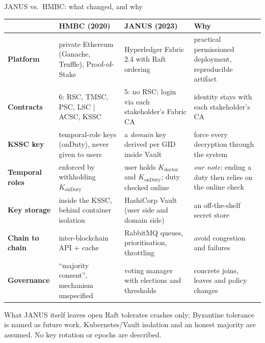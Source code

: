 \documentclass[aspectratio=169,10pt]{beamer}
\begin{document}
\begin{frame}{JANUS vs.\ HMBC: what changed, and why}
\scriptsize
\renewcommand{\arraystretch}{1.2}
\begin{tabular}{@{}>{\bfseries}L{0.14\textwidth} L{0.26\textwidth} L{0.30\textwidth} L{0.27\textwidth}@{}}
\toprule
 & \textbf{HMBC (2020)} & \textbf{JANUS (2023)} & \textbf{Why} \\
\midrule
Platform & private Ethereum (Ganache, Truffle), Proof-of-Stake & Hyperledger Fabric 2.4 with Raft ordering & practical permissioned deployment, reproducible artifact \\
Contracts & 6: RSC, TMSC, PSC, LSC | ACSC, KSSC & 5: no RSC; login via each stakeholder's Fabric CA & identity stays with each stakeholder's CA \\
KSSC key & temporal-role keys (onDuty), never given to users & a \emph{domain} key derived per GID inside Vault & force every decryption through the system \\
Temporal roles & enforced by withholding $K_{\mathrm{onDuty}}$ & user holds $K_{\mathrm{doctor}}$ and $K_{\mathrm{onDuty}}$; duty checked online & \emph{our note:} ending a duty then relies on the online check \\
Key storage & inside the KSSC, behind container isolation & HashiCorp Vault (user side and domain side) & an off-the-shelf secret store \\
Chain to chain & inter-blockchain API + cache & RabbitMQ queues, prioritisation, throttling & avoid congestion and failures \\
Governance & “majority consent”, mechanism unspecified & voting manager with elections and thresholds & concrete joins, leaves and policy changes \\
\bottomrule
\end{tabular}

\vspace{0.5em}
\begin{alertblock}{What JANUS itself leaves open}
\scriptsize Raft tolerates crashes only; Byzantine tolerance is named as future work. Kubernetes/Vault isolation and an honest majority are assumed. No key rotation or epochs are described.
\end{alertblock}
\end{frame}
\end{document}

